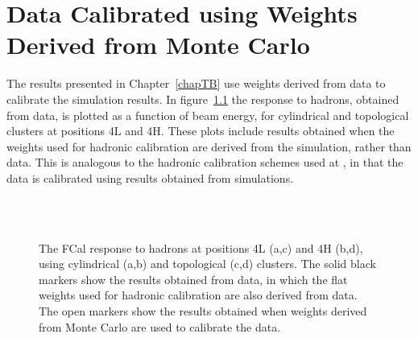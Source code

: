 
\chapter{Data Calibrated using Weights Derived from Monte Carlo}
\label{MC_weights_appendix}
The results presented in Chapter~\ref{chapTB} use weights derived from data to calibrate the simulation results.
In figure~\ref{dataMCweightfig} the response to hadrons, obtained from data, is plotted as a function of beam energy, for cylindrical and topological clusters at positions 4L and 4H. These plots include results obtained when the weights used for hadronic calibration are derived from the simulation, rather than data. This is analogous to the hadronic calibration schemes used at \atlas, in that the data is calibrated using results obtained from simulations. 

\begin{figure}[hb]
\begin{center}
\\
\\
\end{center}
\caption[Hadron data calibrated with MC-derived weights.]{The FCal response to hadrons at positions 4L (a,c) and 4H (b,d), using cylindrical (a,b) and topological (c,d) clusters. The solid black markers show the results obtained from data, in which the flat weights used for hadronic calibration are also derived from data. The open markers show the results obtained when weights derived from Monte Carlo are used to calibrate the data.}
\label{dataMCweightfig}
\end{figure}

